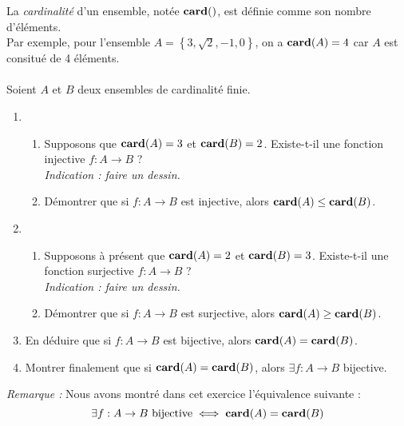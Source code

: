 \begin{exercice}
    La \textit{cardinalité} d'un ensemble, notée $\mathbf{card}()$, est définie comme son nombre d'éléments.\\
    Par exemple, pour l'ensemble $A = \left\{3, \sqrt{2}, -1, 0\right\}$, on a $\mathbf{card}(A)=4$ car $A$ est consitué de 4 éléments.\\ \\
    Soient $A$ et $B$ deux ensembles de cardinalité finie.

    \begin{enumerate}
    
    \item
    \begin{enumerate}
        \item Supposons que $\mathbf{card}(A)=3$ et $\mathbf{card}(B)=2$. Existe-t-il une fonction injective $f:A\rightarrow B$ ?\\
        \textit{Indication : faire un dessin.}

        \item Démontrer que si $f:A\rightarrow B$ est injective, alors $\mathbf{card}(A) \leq \mathbf{card}(B)$.
    \end{enumerate}

    \item
    \begin{enumerate}
        \item Supposons à présent que $\mathbf{card}(A)=2$ et $\mathbf{card}(B)=3$. Existe-t-il une fonction surjective $f:A\rightarrow B$ ?\\
        \textit{Indication : faire un dessin.}

        \item Démontrer que si $f:A\rightarrow B$ est surjective, alors $\mathbf{card}(A) \geq \mathbf{card}(B)$.
    \end{enumerate}


    \item En déduire que si $f:A\rightarrow B$ est bijective, alors $\mathbf{card}(A) = \mathbf{card}(B)$.

    \item Montrer finalement que si $\mathbf{card}(A) = \mathbf{card}(B)$, alors $\exists f:A\rightarrow B$ bijective.
    
    \end{enumerate}
    \textit{Remarque :} Nous avons montré dans cet exercice l'équivalence suivante : $$\exists f:A\rightarrow B \text{ bijective} \iff \mathbf{card}(A)=\mathbf{card}(B)$$
\end{exercice}


